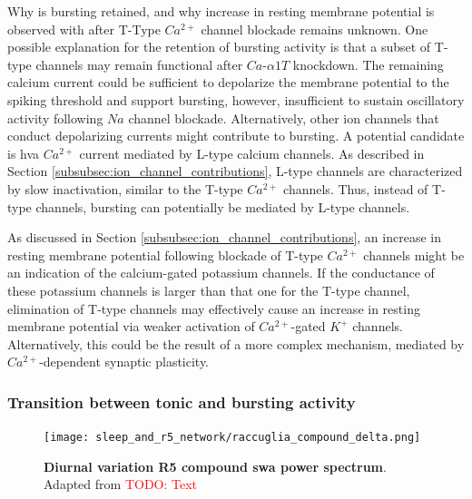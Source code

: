 \documentclass[../main.tex]{subfiles}
\begin{document}
Why is bursting retained, and why increase in resting membrane potential is observed with after T-Type $Ca^{2+}$ channel blockade remains unknown. One possible explanation for the retention of bursting activity is that a subset of T-type channels may remain functional after $Ca$-$\alpha1T$ knockdown. The remaining calcium current could be sufficient to depolarize the membrane potential to the spiking threshold and support bursting, however, insufficient to sustain oscillatory activity following $Na$ channel blockade. Alternatively, other ion channels that conduct depolarizing currents might contribute to bursting. A potential candidate is \gls{hva} $Ca^{2+}$ current mediated by L-type calcium channels. As described in Section \ref{subsubsec:ion_channel_contributions}, L-type channels are characterized by slow inactivation, similar to the T-type $Ca^{2+}$ channels. Thus, instead of T-type channels, bursting can potentially be mediated by L-type channels.

As discussed in Section \ref{subsubsec:ion_channel_contributions}, an increase in resting membrane potential following blockade of T-type $Ca^{2+}$ channels might be an indication of the calcium-gated potassium channels. If the conductance of these potassium channels is larger than that one for the T-type channel, elimination of T-type channels may
effectively cause an increase in resting membrane potential via weaker activation of $Ca^{2+}$-gated $K^+$ channels. Alternatively, this could be the result of a more complex mechanism, mediated by $Ca^{2+}$-dependent synaptic plasticity.


\subsubsection{Transition between tonic and bursting activity} \label{subsubsec:transit_tonic_burst}

\begin{figure}[!b]
    \centering
    \texttt{[image: sleep\_and\_r5\_network/raccuglia\_compound\_delta.png]}
    \caption[Diurnal variation of R5 compound \gls{swa} power spectrum]{
        \textbf{Diurnal variation R5 compound \gls{swa} power spectrum}.
        Adapted from \cite{raccugliaNetworkSpecificSynchronizationElectrical2019}
        \textcolor{red}{TODO: Text}
    }
    \label{fig:raccuglia_compound_delta_oscillations}
\end{figure}
\end{document}
